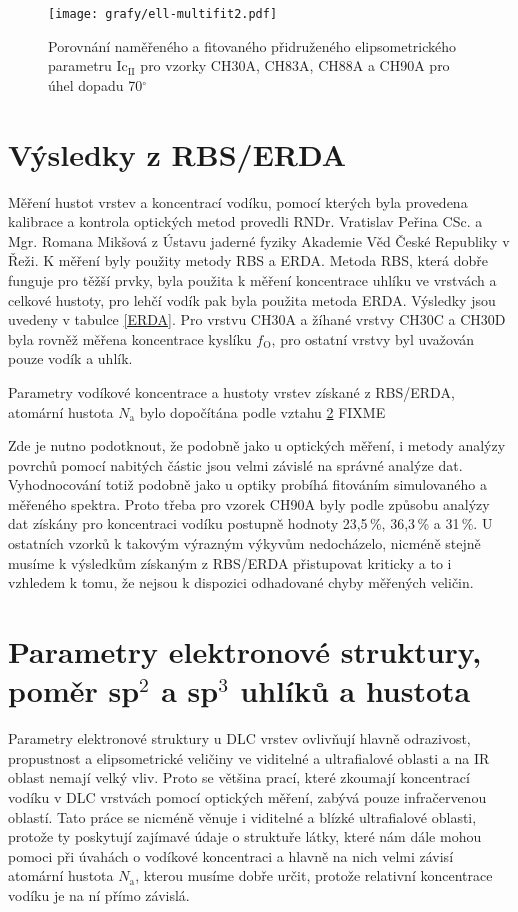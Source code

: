 \begin{figure}[htp]
	\texttt{[image: grafy/ell-multifit2.pdf]}
	\caption{Porovnání naměřeného a fitovaného přidruženého elipsometrického parametru Ic$_{\mathrm{II}}$ pro vzorky CH30A, CH83A, CH88A a CH90A pro úhel dopadu 70$^\circ$}
	\label{ell-multifit2}
\end{figure}

\section{Výsledky z RBS/ERDA}
Měření hustot vrstev a koncentrací vodíku, pomocí kterých byla provedena kalibrace a kontrola optických metod provedli RNDr. Vratislav Peřina CSc. a Mgr. Romana Mikšová z Ústavu jaderné fyziky Akademie Věd České Republiky v Řeži. K měření byly použity metody RBS a ERDA. Metoda RBS, která dobře funguje pro těžší prvky, byla použita k měření koncentrace uhlíku ve vrstvách a celkové hustoty, pro lehčí vodík pak byla použita metoda ERDA. Výsledky jsou uvedeny v tabulce \ref{ERDA}. Pro vrstvu CH30A a žíhané vrstvy CH30C a CH30D byla rovněž měřena koncentrace kyslíku $f_\mathrm{O}$, pro ostatní vrstvy byl uvažován pouze vodík a uhlík.

\begin{table}[h!]
 \centering
	\renewcommand{\tabcolsep}{4pt}
 
 \caption{Parametry vodíkové koncentrace a hustoty vrstev získané z RBS/ERDA, atomární hustota $N_\mathrm{a}$ bylo dopočítána podle vztahu \ref{} FIXME}
\label{ERDA}
\end{table}

Zde je nutno podotknout, že podobně jako u optických měření, i metody analýzy povrchů pomocí nabitých částic jsou velmi závislé na správné analýze dat. Vyhodnocování totiž podobně jako u optiky probíhá fitováním simulovaného a měřeného spektra. Proto třeba pro vzorek CH90A byly podle způsobu analýzy dat získány pro koncentraci vodíku postupně hodnoty 23,5\,\%, 36,3\,\% a 31\,\%. U ostatních vzorků k takovým výrazným výkyvům nedocházelo, nicméně stejně musíme k výsledkům získaným z RBS/ERDA přistupovat kriticky a to i vzhledem k tomu, že nejsou k dispozici odhadované chyby měřených veličin.

\section{Parametry elektronové struktury, poměr sp$^2$ a sp$^3$ uhlíků a hustota}
Parametry elektronové struktury u DLC vrstev ovlivňují hlavně odrazivost, propustnost a elipsometrické veličiny ve viditelné a ultrafialové oblasti a na IR oblast nemají velký vliv. 
Proto se většina prací, které zkoumají koncentrací vodíku v DLC vrstvách pomocí optických měření, zabývá pouze infračervenou oblastí. Tato práce se nicméně věnuje i viditelné a blízké ultrafialové oblasti, protože ty poskytují zajímavé údaje o struktuře látky, které nám dále mohou pomoci při úvahách o vodíkové koncentraci a hlavně na nich velmi závisí atomární hustota $N_\mathrm{a}$, kterou musíme dobře určit, protože relativní koncentrace vodíku je na ní přímo závislá. 


